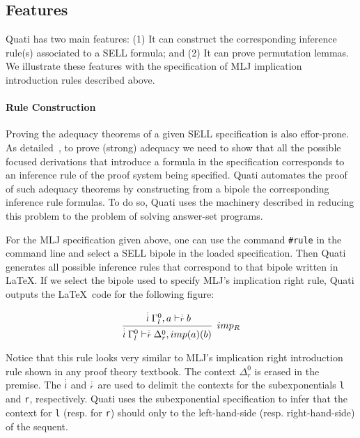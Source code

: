 \documentclass{llncs}
\newcommand{\ndots}[1]{\stackrel{\vcenter{\hbox{$\scriptstyle :$}\vskip-.35ex}}
   {\hbox {$ \scriptstyle {#1}$}}}
\begin{document}

\subsection{Features}

Quati has two main features: (1) It can construct the corresponding inference rule(s) associated
to a SELL formula; and (2) It can prove permutation lemmas. We illustrate these features with 
the specification of MLJ implication introduction rules described above.

\paragraph{Rule Construction} Proving the adequacy theorems of a given SELL specification is also 
effor-prone. As detailed~\cite{nigam.jlc}, to prove (strong) adequacy we need to show that all 
the possible focused derivations that introduce a formula in the specification corresponds to 
an inference rule of the proof system being specified. Quati automates the proof of such 
adequacy theorems by constructing from a bipole the corresponding inference rule formulas. 
To do so, Quati uses the machinery described in \cite{nigam13iclp,nigam14ebl} reducing
this problem to the problem of solving answer-set programs. 

For the MLJ specification given above, one can use the command \texttt{\#rule} in the command 
line and select a SELL bipole in the loaded specification. Then Quati generates all possible 
inference rules that correspond to that bipole written in \LaTeX. If we select the bipole used to specify 
MLJ's implication right rule, Quati outputs the \LaTeX\ code for the following figure:
\vspace{-3mm}

{\small
\[
\cfrac{ \ndots{l} \Gamma_{l}^{0}, a \vdash  \ndots{r} b}
{ \ndots{l} \Gamma_{l}^{0} \vdash  \ndots{r} \Delta_{r}^{0}, imp (a) (b) } \;\; imp_{R}
\]
}

Notice that this rule looks very similar to MLJ's implication right introduction rule shown in any proof theory 
textbook. The context $\Delta_{r}^{0}$ is erased in the premise. The $\ndots{l}$ and $\ndots{r}$ are used to 
delimit the contexts for the subexponentials \texttt{l} and \texttt{r}, respectively. Quati uses the subexponential 
specification to infer that the context for \texttt{l} (resp. for \texttt{r}) should only to the left-hand-side (resp. 
right-hand-side) of the sequent.
\end{document}
